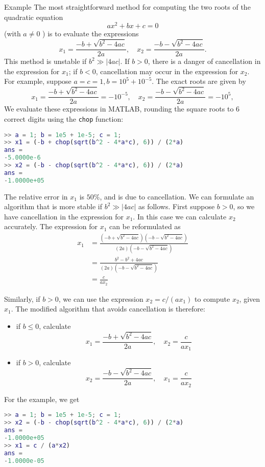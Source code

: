 \begin{example}
    Example The most straightforward method for computing the two roots of the quadratic equation
$$
a x^{2}+b x+c=0
$$
(with $ a \neq 0 $ ) is to evaluate the expressions
$$
x_{1}=\frac{-b+\sqrt{b^{2}-4 a c}}{2 a}, \quad x_{2}=\frac{-b-\sqrt{b^{2}-4 a c}}{2 a} .
$$
This method is unstable if $ b^{2} \gg|4 a c| $. If $ b>0 $, there is a danger of cancellation in the expression for $ x_{1} $; if $ b<0 $, cancellation may occur in the expression for $ x_{2} $.
For example, suppose $ a=c=1, b=10^{5}+10^{-5} $. The exact roots are given by
$$
x_{1}=\frac{-b+\sqrt{b^{2}-4 a c}}{2 a}=-10^{-5}, \quad x_{2}=\frac{-b-\sqrt{b^{2}-4 a c}}{2 a}=-10^{5},
$$
We evaluate these expressions in MATLAB, rounding the square roots to 6 correct digits using the \verb|chop| function:

\begin{lstlisting}[caption=example 1 for cancellation,language=matlab]
>> a = 1; b = 1e5 + 1e-5; c = 1;
>> x1 = (-b + chop(sqrt(b^2 - 4*a*c), 6)) / (2*a)
ans =
-5.0000e-6
>> x2 = (-b - chop(sqrt(b^2 - 4*a*c), 6)) / (2*a)
ans =
-1.0000e+05
\end{lstlisting}


The relative error in $ x_{1} $ is $ 50 \% $, and is due to cancellation.
We can formulate an algorithm that is more stable if $ b^{2} \gg|4 a c| $ as follows. First suppose $ b>0 $, so we have cancellation in the expression for $ x_{1} $. In this case we can calculate $ x_{2} $ accurately. The expression for $ x_{1} $ can be reformulated as
$$
\begin{aligned}
x_{1} &=\frac{\left(-b+\sqrt{b^{2}-4 a c}\right)\left(-b-\sqrt{b^{2}-4 a c}\right)}{(2 a)\left(-b-\sqrt{b^{2}-4 a c}\right)} \\
&=\frac{b^{2}-b^{2}+4 a c}{(2 a)\left(-b-\sqrt{b^{2}-4 a c}\right)} \\
&=\frac{c}{a x_{2}}
\end{aligned}
$$

Similarly, if $ b>0 $, we can use the expression $ x_{2}=c /\left(a x_{1}\right) $ to compute $ x_{2} $, given $ x_{1} $. The modified algorithm that avoids cancellation is therefore:

\begin{itemize}
    \item if $ b \leq 0 $, calculate
$$
x_{1}=\frac{-b+\sqrt{b^{2}-4 a c}}{2 a}, \quad x_{2}=\frac{c}{a x_{1}}
$$
    \item if $ b>0 $, calculate
$$
x_{2}=\frac{-b-\sqrt{b^{2}-4 a c}}{2 a}, \quad x_{1}=\frac{c}{a x_{2}}
$$
\end{itemize}


For the example, we get

\begin{lstlisting}[caption=example 2 for cancellation,language=matlab]
>> a = 1; b = 1e5 + 1e-5; c = 1;
>> x2 = (-b - chop(sqrt(b^2 - 4*a*c), 6)) / (2*a)
ans =
-1.0000e+05
>> x1 = c / (a*x2)
ans =
-1.0000e-05
\end{lstlisting}


\end{example}

